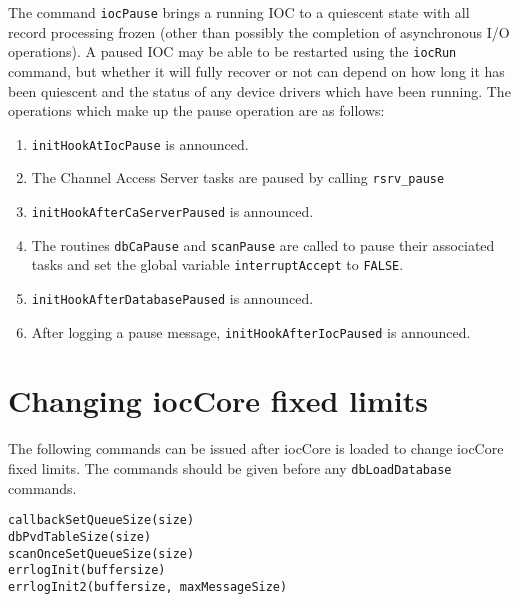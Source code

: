 The command \verb|iocPause| brings a running IOC to a quiescent state with all record processing frozen (other than possibly 
the completion of asynchronous I/O operations).
A paused IOC may be able to be restarted using the \verb|iocRun| command, but whether it will fully recover or not can depend on how long it has been quiescent and the status of any device drivers 
which have been running.
The operations which make up the pause operation are as follows:

\begin{enumerate}
\item \verb|initHookAtIocPause| is announced.

\item The Channel Access Server tasks are paused by calling \verb|rsrv_pause|

\item \verb|initHookAfterCaServerPaused| is announced.

\item The routines \verb|dbCaPause| and \verb|scanPause| are called to pause their associated tasks and set the global variable 
\verb|interruptAccept| to \verb|FALSE|.

\item \verb|initHookAfterDatabasePaused| is announced.

\item After logging a pause message, \verb|initHookAfterIocPaused| is announced.
\end{enumerate}

\section{Changing iocCore fixed limits}

The following commands can be issued after iocCore is loaded to change iocCore fixed limits.
The commands should be given before any \verb|dbLoadDatabase| commands.

\begin{verbatim}
callbackSetQueueSize(size)
dbPvdTableSize(size)
scanOnceSetQueueSize(size)
errlogInit(buffersize)
errlogInit2(buffersize, maxMessageSize)
\end{verbatim}

